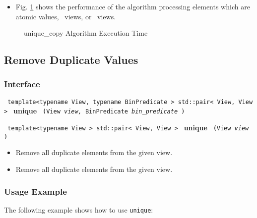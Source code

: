\begin{itemize}
\item
Fig. \ref{fig:uniq-copy-alg-exec-exper}
shows the performance of the algorithm processing
elements which are atomic values, \stl\ views, or \stapl\ views.
\end{itemize}

\begin{figure}[p]
\caption{unique\_copy Algorithm Execution Time}
\label{fig:uniq-copy-alg-exec-exper}
\end{figure}


\subsection{Remove Duplicate Values} \label{sec-remv-uniq}

\subsubsection{Interface} %

\noindent
\texttt{%
template<typename View, typename BinPredicate >
\newline
std::pair< View, View > 
}
\newline
\textbf{unique}%
\texttt{%
(View 
\textit{view,}%
BinPredicate 
\textit{bin\_predicate}%
)
}
\vspace{0.4cm}

\noindent
\texttt{%
template<typename View >
\newline
std::pair< View, View > 
}
\newline
\textbf{unique}%
\texttt{%
(View 
\textit{view}%
)
}

\begin{itemize}
\item
Remove all duplicate elements from the given view. 
\item
Remove all duplicate elements from the given view. 
\end{itemize}

\subsubsection{Usage Example} %

The following example shows how to use \texttt{unique}:

 
